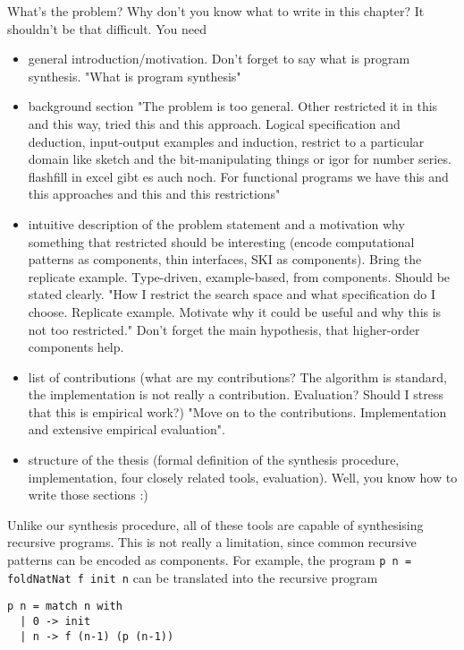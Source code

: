 What's the problem? Why don't you know what to write in this chapter? It shouldn't be that difficult. You need
\begin{itemize}
\item general introduction/motivation. Don't forget to say what is program synthesis. "What is program synthesis"
\item background section "The problem is too general. Other restricted it in this and this way, tried this and this approach. Logical specification and deduction, input-output examples and induction, restrict to a particular domain like sketch and the bit-manipulating things or igor for number series. flashfill in excel gibt es auch noch. For functional programs we have this and this approaches and this and this restrictions"
\item intuitive description of the problem statement and a motivation why something that restricted should be interesting (encode computational patterns as components, thin interfaces, SKI as components). Bring the replicate example. Type-driven, example-based, from components. Should be stated clearly. "How I restrict the search space and what specification do I choose. Replicate example. Motivate why it could be useful and why this is not too restricted." Don't forget the main hypothesis, that higher-order components help.
\item list of contributions (what are my contributions? The algorithm is standard, the implementation is not really a contribution. Evaluation? Should I stress that this is empirical work?) "Move on to the contributions. Implementation and extensive empirical evaluation".
\item structure of the thesis (formal definition of the synthesis procedure, implementation, four closely related tools, evaluation). Well, you know how to write those sections :)
\end{itemize} 


Unlike our synthesis procedure, all of these tools are capable of synthesising recursive programs. This is not really a limitation, since common recursive patterns can be encoded as components. For example, the program \lstinline!p n = foldNatNat f init n! can be translated into the recursive program
\begin{lstlisting}[style=plain]
p n = match n with
  | 0 -> init
  | n -> f (n-1) (p (n-1))
\end{lstlisting}  


